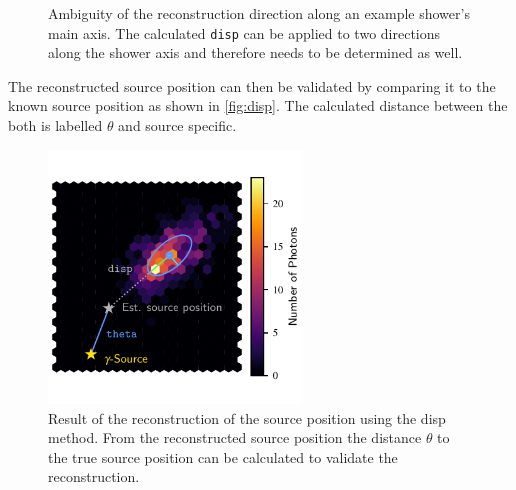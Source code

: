 \begin{figure}
\begin{subfigure}{0.5\textwidth}
  \end{subfigure}
  \caption{Ambiguity of the reconstruction direction along an example shower's main axis. The calculated \texttt{disp} can be applied to two directions along the shower axis and therefore needs to be determined as well.}
  \label{fig:disp_amb}
\end{figure}
%
The reconstructed source position can then be validated by comparing it to the
known source position as shown in \autoref{fig:disp}. The calculated distance
between the both is labelled $\theta$ and source specific.
%
\begin{figure}
  \centering%
  \includegraphics[width=0.6\textwidth]{Plots/hillas_disp.pdf}%
  \caption{Result of the reconstruction of the source position using the disp method. From the reconstructed source position the distance $\theta$ to the true source position can be calculated to validate the reconstruction.}%
  \label{fig:disp}%
\end{figure}
%
